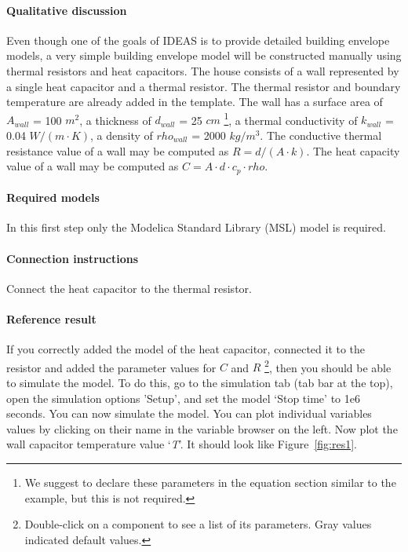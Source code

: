 \documentclass[10pt,a4paper]{article}
\begin{document}
\paragraph{Qualitative discussion}
Even though one of the goals of IDEAS is to provide
detailed building envelope models, a very simple building
envelope model will be constructed manually using thermal
resistors and heat capacitors.
The house consists of a wall represented 
by a single heat capacitor and a thermal resistor. 
The thermal resistor and boundary temperature 
are already added in the template.
The wall has a surface area of $A_{wall}$ = 100 $m^2$, 
a thickness of $d_{wall}$ = 25 $cm$
\footnote{We suggest to declare these parameters in the equation section similar to the example, but this is not required.}, 
a thermal conductivity of $k_{wall}$ = 0.04 $W/(m\cdot K)$, 
a density of $rho_{wall}$ = 2000 $kg/m^3$.
The conductive thermal resistance value of a wall may be computed as $R=d/(A\cdot k)$.
The heat capacity value of a wall may be computed as $C=A\cdot d \cdot c_p \cdot rho$.

\paragraph{Required models}
In this first step only the Modelica Standard Library (MSL) 
model 
is required.

\paragraph{Connection instructions}
Connect the heat capacitor to the thermal resistor.

\paragraph{Reference result}
If you correctly added the model of the heat capacitor, connected it to the resistor and 
added the parameter values for $C$ and $R$
\footnote{Double-click on a component to see a list of its parameters. Gray values indicated default values.},
then you should be able to simulate the model.
To do this, go to the simulation tab (tab bar at the top),
open the simulation options 'Setup',
and set the model `Stop time' to 1e6 seconds.
You can now simulate the model.
You can plot individual variables values by clicking on their name in the variable browser on the left.
Now plot the wall capacitor temperature value `\textit{T}'. 
It should look like Figure~\ref{fig:res1}.
\end{document}
